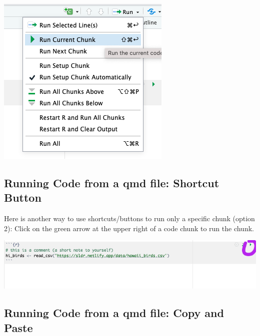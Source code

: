 \documentclass[
  letterpaper,
  DIV=11,
  numbers=noendperiod]{scrreprt}
\theoremstyle{remark}
\begin{document}
\begin{center}
\includegraphics[width=0.85\linewidth,height=\textheight,keepaspectratio]{images/run-menu.png}
\end{center}

\subsection{Running Code from a qmd file: Shortcut
Button}\label{running-code-from-a-qmd-file-shortcut-button}

Here is another way to use shortcuts/buttons to run only a specific
chunk (option 2): Click on the green arrow at the upper right of a code
chunk to run the chunk.

\begin{center}
\includegraphics[width=0.85\linewidth,height=\textheight,keepaspectratio]{images/run-button-new.png}
\end{center}

\subsection{Running Code from a qmd file: Copy and
Paste}\label{running-code-from-a-qmd-file-copy-and-paste}
\end{document}
